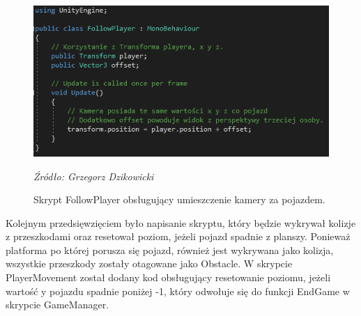 \begin{figure}[!h]
\centering
  \includegraphics[width=1\linewidth]{followplayer.png}
  \caption{Skrypt FollowPlayer obsługujący umieszczenie kamery za pojazdem.}\label{rys_4}
  \begin{minipage}[t]{0.75\linewidth}
    \emph{Źródło: Grzegorz Dzikowicki}
  \end{minipage}
\end{figure}

\newpage
\indent Kolejnym przedsięwzięciem było napisanie skryptu, który będzie wykrywał kolizje z przeszkodami oraz resetował poziom, jeżeli pojazd spadnie z planszy. Ponieważ platforma po której porusza się pojazd, również jest wykrywana jako kolizja, wszystkie przeszkody zostały otagowane jako Obstacle. W skrypcie PlayerMovement został dodany kod obsługujący resetowanie poziomu, jeżeli wartość y pojazdu spadnie poniżej -1, który odwołuje się do funkcji EndGame w skrypcie GameManager.

